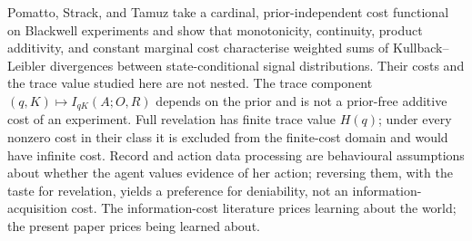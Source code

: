 \documentclass[11pt,a4paper]{article}
\theoremstyle{definition}
\newcommand{\Sh}{H}
\newcommand{\1}{\mathbf 1}
\begin{document}
Pomatto, Strack, and Tamuz \cite{PomattoStrackTamuz2023} take a cardinal, prior-independent cost functional on
Blackwell experiments and show that monotonicity, continuity, product additivity, and constant marginal cost
characterise weighted sums of Kullback--Leibler divergences between state-conditional signal distributions.
Their costs and the trace value studied here are not nested.  The trace component
$(q,K)\mapsto I_{qK}(A;O,R)$ depends on the prior and is not a prior-free additive cost of an experiment.  Full
revelation has finite trace value $\Sh(q)$; under every nonzero cost in their class it is excluded from the
finite-cost domain and would have infinite cost.  Record and action data processing are behavioural assumptions
about whether the agent values evidence of her action; reversing them, with the taste for revelation, yields a
preference for deniability, not an information-acquisition cost.  The information-cost literature prices
learning about the world; the present paper prices being learned about.
\end{document}
